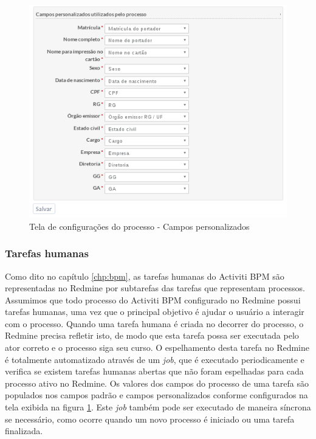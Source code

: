 \begin{figure}[H]
\centering
\includegraphics[width=1\textwidth]{imagens/plugin_process_settings2.png}
\caption{Tela de configurações do processo - Campos personalizados}
\label{fig:plugin_process_settings}
\end{figure}

\subsubsection{Tarefas humanas}\label{sec:integracao_redmine_activiti_sincronizacao-criacao_human_task}

Como dito no capítulo  \ref{chp:bpm}, as tarefas humanas do Activiti BPM são representadas no Redmine por subtarefas das tarefas que representam processos. Assumimos que todo processo do Activiti BPM configurado no Redmine possui tarefas humanas, uma vez que o principal objetivo é ajudar o usuário a interagir com o processo.
Quando uma tarefa humana é criada no decorrer do processo, o Redmine precisa refletir isto, de modo que esta tarefa possa ser executada pelo ator correto e o processo siga seu curso. O espelhamento desta tarefa no Redmine é totalmente automatizado através de um \textit{job}, que é executado periodicamente e verifica se existem tarefas humanas abertas que não foram espelhadas para cada processo ativo no Redmine. Os valores dos campos do processo de uma tarefa são populados nos campos padrão e campos personalizados conforme configurados na tela exibida na figura \ref{fig:plugin_process_settings}. Este \textit{job} também pode ser executado de maneira síncrona se necessário, como ocorre quando um novo processo é iniciado ou uma tarefa finalizada.

